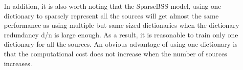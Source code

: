 In addition, it is also worth noting that the SparseBSS model, using one dictionary to sparsely represent all the sources will get almost the same performance as using multiple but same-sized dictionaries when the dictionary redundancy d/n is large enough. As a result, it is reasonable to train only one dictionary for all the sources. An obvious advantage of using one dictionary is that the computational cost does not increase when the number of sources increases.\\